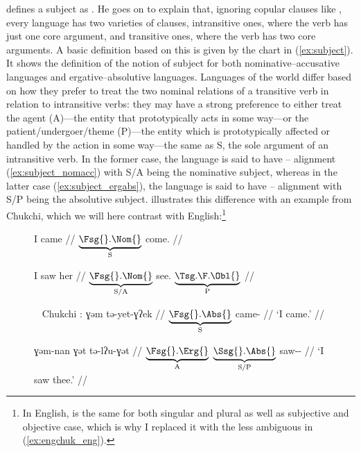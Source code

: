 \citet{dixon2010a} defines a subject as . He goes on to explain that,
ignoring copular clauses like , every language has
two varieties of clauses, intransitive ones, where the verb has just one core
argument, and transitive ones, where the verb has two core arguments. A basic
definition based on this is given by the chart in (\ref{ex:subject}). It shows
the definition of the notion of subject for both nominative--accusative
languages and ergative--absolutive languages. Languages of the world differ
based on how they prefer to treat the two nominal relations of a transitive
verb in relation to intransitive verbs: they may have a strong preference to
either treat the agent (A)---the entity that prototypically acts in some
way---or the patient/undergoer/theme (P)---the entity which is prototypically
affected or handled by the action in some way---the same as S, the sole
argument of an intransitive verb. In the former case, the language is said to
have \Nom{}--\Acc{} alignment (\ref{ex:subject_nomacc}) with S/A being the
nominative subject, whereas in the latter case (\ref{ex:subject_ergabs}), the
language is said to have \Erg{}--\Abs{} alignment with S/P being the absolutive
subject. \citet{comrie1989} illustrates this difference with an example from
Chukchi, which we will here contrast with English:\footnote{In English,
 is the same for both singular and plural as well as subjective and
objective case, which is why I replaced it with the less ambiguous
 in (\ref{ex:engchuk_eng}).}

\begin{figure}[h]
\pex\label{ex:engchuk_eng}
\a\label{ex:engchuk_eng1}\begingl
	\gla I came //
	\glb $\underbrace{\text{\Fsg{}.\Nom{}}}_{\text{S}}$
		come.\Pst{} //
\endgl

\a\label{ex:engchuk_eng2}\begingl
	\gla I saw her //
	\glb $\underbrace{\text{\Fsg{}.\Nom{}}}_{\text{S/A}}$
		see.\Pst{}
		$\underbrace{\text{\TsgF{}.\Obl{}}}_{\text{P}}$
		//
\endgl

\xe
\end{figure}

\begin{figure}[h]
\pex~\label{ex:engchuk_chuk}%
Chukchi \parencite[adapted from][104]{comrie1989}:
\a\label{ex:engchuk_chuk1}\begingl
	\gla ɣəm tə-yet-ɣʔek //
	\glb $\underbrace{\text{\Fsg{}.\Abs{}}}_{\text{S}}$
		came-\Fsg{} //
	\glft `I came.' //
\endgl

\a\label{ex:engchuk_chuk2}\begingl
	\gla ɣəm-nan ɣət tə-lʔu-ɣət //
	\glb $\underbrace{\text{\Fsg{}.\Erg{}}}_{\text{A}}$
		$\underbrace{\text{\Ssg{}.\Abs{}}}_{\text{S/P}}$
		saw-\Fsg{}-\Ssg{} //
	\glft `I saw thee.' //
\endgl

\xe
\end{figure}

